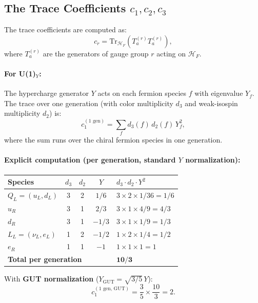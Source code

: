 \documentclass[12pt,a4paper]{article}
\begin{document}
\subsection{The Trace Coefficients $c_1, c_2, c_3$}
\label{sec:ccm-traces}

The trace coefficients are computed as:
\begin{equation}
c_r = \mathrm{Tr}_{\mathcal{H}_F}\!\left(T^{(r)}_a T^{(r)}_a\right),
\end{equation}
where $T^{(r)}_a$ are the generators of gauge group $r$ acting on
$\mathcal{H}_F$.

\paragraph{For U(1)$_Y$:}
The hypercharge generator $Y$ acts on each fermion species $f$ with eigenvalue
$Y_f$.  The trace over one generation (with color multiplicity $d_3$ and
weak-isospin multiplicity $d_2$) is:
\begin{equation}
c_1^{(\text{1 gen})} = \sum_f d_3(f)\,d_2(f)\,Y_f^2,
\end{equation}
where the sum runs over the chiral fermion species in one generation.

\paragraph{Explicit computation (per generation, standard $Y$ normalization):}
\begin{center}
\renewcommand{\arraystretch}{1.2}
\begin{tabular}{lcccl}
\toprule
\textbf{Species} & $d_3$ & $d_2$ & $Y$ & $d_3 \cdot d_2 \cdot Y^2$ \\
\midrule
$Q_L = (u_L, d_L)$ & 3 & 2 & $1/6$ & $3 \times 2 \times 1/36 = 1/6$ \\
$u_R$ & 3 & 1 & $2/3$ & $3 \times 1 \times 4/9 = 4/3$ \\
$d_R$ & 3 & 1 & $-1/3$ & $3 \times 1 \times 1/9 = 1/3$ \\
$L_L = (\nu_L, e_L)$ & 1 & 2 & $-1/2$ & $1 \times 2 \times 1/4 = 1/2$ \\
$e_R$ & 1 & 1 & $-1$ & $1 \times 1 \times 1 = 1$ \\
\midrule
\multicolumn{4}{l}{\textbf{Total per generation}} & $\mathbf{10/3}$ \\
\bottomrule
\end{tabular}
\end{center}

With \textbf{GUT normalization} ($Y_{\mathrm{GUT}} = \sqrt{3/5}\,Y$):
\begin{equation}
c_1^{(\text{1 gen, GUT})} = \frac{3}{5} \times \frac{10}{3} = 2.
\end{equation}
\end{document}

